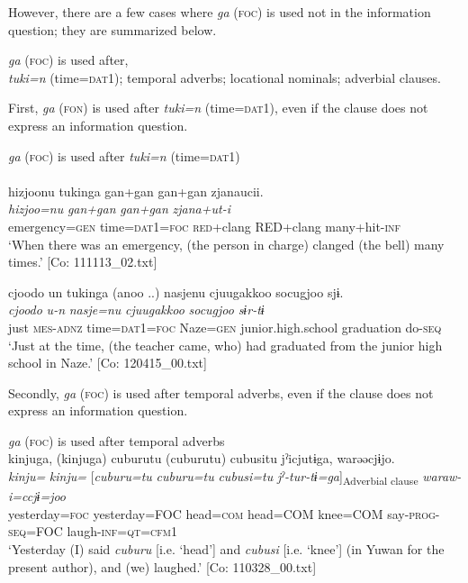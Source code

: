   However, there are a few cases where \textit{ga} (\textsc{foc}) is used not in the information question; they are summarized below.

\ea\label{ex:10.12}\textit{ga} (\textsc{foc}) is used after,\\
  \ea \textit{tuki=n} (time=\textsc{dat}1);
  \ex temporal adverbs;
  \ex locational nominals;
  \ex adverbial clauses.
  \z
\z

First, \textit{ga} (\textsc{fon}) is used after \textit{tuki=n} (time=\textsc{dat}1), even if the clause does not express an information question.

\ea\label{ex:10.13}   \textit{ga} (\textsc{foc}) is used after \textit{tuki=n} (time=\textsc{dat}1)\\
  \ea\relax  [= (4-25 c)]\\
      \glll    {\textbar}hizjoo{\textbar}nu  tukinga  gan+gan  gan+gan                  zjanaucii.\\
      \textit{hizjoo=nu}  \textit{}  \textit{gan+gan}  \textit{gan+gan}        \textit{zjana+ut-i}\\
      emergency=\textsc{gen}  time=\textsc{dat}1=\textsc{foc}  \textsc{red}+clang  RED+clang                                many+hit-\textsc{inf}\\
      \glt       ‘When there was an emergency, (the person in charge) clanged (the bell) many times.’ [Co: 111113\_02.txt]

  \ex  %
      \glll    {\textbar}cjoodo{\textbar}  un  tukinga  (anoo ..)  nasjenu    cjuugakkoo  {\textbar}socugjoo{\textbar}  sjɨ.\\
      \textit{cjoodo}  \textit{u-n}  \textit{}    \textit{nasje=nu}    \textit{cjuugakkoo}  \textit{socugjoo}  \textit{sɨr-tɨ}\\
      just  \textsc{mes}-\textsc{adnz}  time=\textsc{dat}1=\textsc{foc}    Naze=\textsc{gen}     junior.high.school  graduation  do-\textsc{seq}  \\
      \glt       ‘Just at the time, (the teacher came, who) had graduated from the junior high school in Naze.’ [Co: 120415\_00.txt]
    \z
\z

  Secondly, \textit{ga} (\textsc{foc}) is used after temporal adverbs, even if the clause does not express an information question.

\ea\label{ex:10.14}   \textit{ga} (\textsc{foc}) is used after temporal adverbs\\
  \ea  %
      \glll    kinjuga,  (kinjuga)  cuburutu  (cuburutu)  cubusitu     jˀicjutɨga,  warəəcjɨjo.\\
      \textit{kinju=}  \textit{kinju=}  [\textit{cuburu=tu}  \textit{cuburu=tu}  \textit{cubusi=tu}   \textit{jˀ-tur-tɨ=ga}]\textsubscript{Adverbial clause} \textit{waraw-i=ccjɨ=joo}\\
      yesterday=\textsc{foc}  yesterday=FOC  head=\textsc{com}  head=COM  knee=COM say-\textsc{prog}-\textsc{seq}=FOC  laugh-\textsc{inf}=\textsc{qt}=\textsc{cfm}1\\
      \glt       ‘Yesterday (I) said \textit{cuburu} [i.e. ‘head’] and \textit{cubusi} [i.e. ‘knee’] (in Yuwan for the present author), and (we) laughed.’ [Co: 110328\_00.txt]

